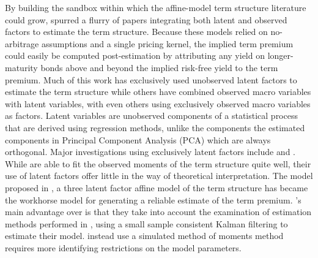 \documentclass{article}
\numberwithin{equation}{section}
\begin{document}
By building the sandbox within which the affine-model term structure literature
could grow, \citet{duffiekan1996} spurred a flurry of papers integrating both
latent and observed factors to estimate the term structure. Because these
models relied on no-arbitrage assumptions and a single pricing kernel, the
implied term premium could easily be computed post-estimation by attributing
any yield on longer-maturity bonds above and beyond the implied risk-free yield
to the term premium. Much of this work has exclusively used unobserved latent
factors to estimate the term structure while others have combined observed
macro variables with latent variables, with even others using exclusively
observed macro variables as factors. Latent variables are unobserved components
of a statistical process that are derived using regression methods, unlike the
components the estimated components in Principal Component Analysis (PCA) which
are always orthogonal. Major investigations using exclusively latent factors
include \citet{daisingleton2000} and \citet{kim2005arbitrage}. While
\citet{daisingleton2000} are able to fit the observed moments of the term
structure quite well, their use of latent factors offer little in the way of
theoretical interpretation. The model proposed in \citet{kim2005arbitrage},
a three latent factor affine model of the term structure has became the
workhorse model for generating a reliable estimate of the term premium.
\citet{kim2005arbitrage}'s main advantage over \citet{daisingleton2000} is that
they take into account the examination of estimation methods performed in
\citet{duffee2004estimation}, using a small sample consistent Kalman filtering
to estimate their model.\citet{daisingleton2000} instead use a simulated method
of moments method requires more identifying restrictions on the model
parameters. 
\end{document}
